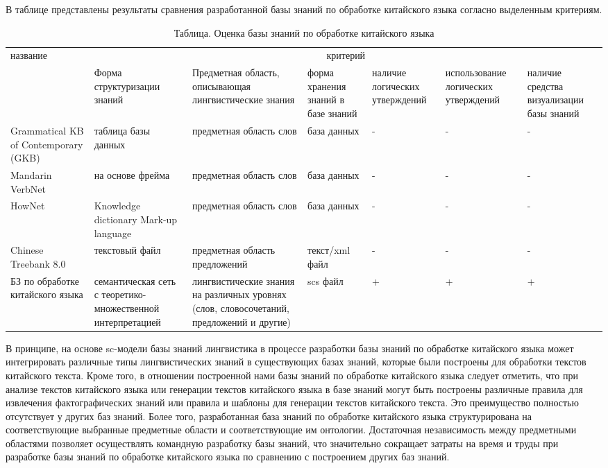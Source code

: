 В таблице \textit{} представлены результаты сравнения разработанной базы знаний по обработке китайского языка согласно выделенным критериям.

\renewcommand\arraystretch{3}
\begin{table}[]
	\caption{Таблица. Оценка базы знаний по обработке китайского языка}
	\label{table:knowledge-base}
	\begin{tabular}{|m{7em}<{\centering}|m{7em}|m{10em}|m{7em}|m{7em}|m{6em}|m{10em}|}
		\hline
		\multirow{2}{*}{название}
		& \multicolumn{6}{c|}{критерий}
		\\ \cline{2-7}
		{}
		& Форма структуризации знаний   
		& Предметная область, описывающая лингвистические знания
		& форма хранения знаний в базе знаний
		& наличие логических утверждений
		& использование логических утверждений 
		& наличие средства визуализации базы знаний \\
		\hline
		Grammatical KB of Contemporary (GKB) 
		& таблица базы данных
		& предметная область слов
		& база данных
		& -
		& -
		& -  \\ 
		\hline
		Mandarin   VerbNet
		&на основе фрейма
		& предметная область слов
		& база данных
		& -
		& -
		& - \\ 
		\hline
		HowNet
		& Knowledge dictionary Mark-up language
		&предметная область слов
		&база данных
		& -     
		& -
		& - \\ 
		\hline
		Chinese   Treebank 8.0
		& текстовый файл
		& предметная область предложений
		& текст/xml файл
		& -
		& -
		& - \\ 
		\hline
		БЗ   по обработке китайского языка
		& семантическая сеть с   теоретико-множественной интерпретацией
		& лингвистические знания на различных   уровнях (слов, словосочетаний, предложений и другие)
		& scs   файл
		& +
		& +
		& + \\
		\hline
	\end{tabular}
\end{table}

В принципе, на основе sc-модели базы знаний лингвистика в процессе разработки базы знаний по обработке китайского языка может интегрировать различные типы лингвистических знаний в существующих базах знаний, которые были построены для обработки текстов китайского текста. Кроме того, в отношении построенной нами базы знаний по обработке китайского языка следует отметить, что при анализе текстов китайского языка или генерации текстов китайского языка в базе знаний могут быть построены различные правила для извлечения фактографических знаний или правила и шаблоны для генерации текстов китайского текста. Это преимущество полностью отсутствует у других баз знаний. Более того, разработанная база знаний по обработке китайского языка структурирована на соответствующие выбранные предметные области и соответствующие им онтологии. Достаточная независимость между предметными областями позволяет осуществлять командную разработку базы знаний, что значительно сокращает затраты на время и труды при разработке базы знаний по обработке китайского языка по сравнению с построением других баз знаний. 

